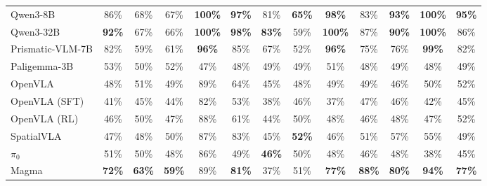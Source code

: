 \documentclass{llmxive}
\providecommand{\heatDG}[1]{\cellcolor{mydarkgreen}\textbf{#1}}
\providecommand{\heatG}[1]{\cellcolor{mygreen}#1}
\providecommand{\heatLG}[1]{\cellcolor{mylightgreen}#1}
\providecommand{\heatO}[1]{\cellcolor{myorange}#1}
\providecommand{\heatR}[1]{\cellcolor{myred}#1}
\begin{document}
\begin{table}[t]
{\begin{tabular}{lcccccccccccc}
Qwen3-8B
& \heatG{86\%} & \heatG{68\%} & \heatG{67\%} & \heatDG{\textbf{100\%}} & \heatDG{97\%} & \heatG{81\%} & \heatG{\textbf{65\%}} & \heatDG{98\%} & \heatG{83\%} & \heatDG{\textbf{93\%}} & \heatDG{\textbf{100\%}} & \heatDG{95\%} \\

Qwen3-32B
& \heatDG{92\%} & \heatG{67\%} & \heatG{66\%} & \heatDG{\textbf{100\%}} & \heatDG{\textbf{98\%}} & \heatG{\textbf{83\%}} & \heatLG{59\%} & \heatDG{\textbf{100\%}} & \heatG{87\%} & \heatDG{90\%} & \heatDG{\textbf{100\%}} & \heatG{86\%} \\

Prismatic-VLM-7B
& \heatG{82\%} & \heatLG{59\%} & \heatG{61\%} & \heatDG{96\%} & \heatG{85\%} & \heatG{67\%} & \heatO{52\%} & \heatDG{96\%} & \heatG{75\%} & \heatG{76\%} & \heatDG{99\%} & \heatG{82\%} \\

Paligemma-3B
& \heatO{53\%} & \heatO{50\%} & \heatO{52\%} & \heatO{47\%} & \heatO{48\%} & \heatO{49\%} & \heatO{49\%} & \heatO{51\%} & \heatO{48\%} & \heatO{49\%} & \heatO{48\%} & \heatO{49\%} \\
\midrule
OpenVLA
& \heatO{48\%} & \heatO{51\%} & \heatO{49\%} & \heatG{89\%} & \heatG{64\%} & \heatR{45\%} & \heatO{48\%} & \heatO{49\%} & \heatO{49\%} & \heatO{46\%} & \heatO{50\%} & \heatO{52\%} \\

OpenVLA (SFT)
& \heatR{41\%} & \heatR{45\%} & \heatR{44\%} & \heatG{82\%} & \heatO{53\%} & \heatR{38\%} & \heatO{46\%} & \heatR{37\%} & \heatO{47\%} & \heatO{46\%} & \heatR{42\%} & \heatR{45\%} \\

OpenVLA (RL)
& \heatO{46\%} & \heatO{50\%} & \heatO{47\%} & \heatG{88\%} & \heatG{61\%} & \heatR{44\%} & \heatO{50\%} & \heatO{48\%} & \heatO{46\%} & \heatO{48\%} & \heatO{47\%} & \heatO{52\%} \\

SpatialVLA
& \heatO{47\%} & \heatO{48\%} & \heatO{50\%} & \heatG{87\%} & \heatG{83\%} & \heatR{45\%} & \heatO{\textbf{52\%}} & \heatO{46\%} & \heatO{51\%} & \heatLG{57\%} & \heatLG{55\%} & \heatO{49\%} \\

$\pi_0$
& \heatO{51\%} & \heatO{50\%} & \heatO{48\%} & \heatG{86\%} & \heatO{49\%} & \heatO{\textbf{46\%}} & \heatO{50\%} & \heatO{48\%} & \heatO{46\%} & \heatO{48\%} & \heatR{38\%} & \heatR{45\%} \\

Magma
& \heatG{\textbf{72\%}} & \heatG{\textbf{63\%}} & \heatLG{\textbf{59\%}} & \heatG{89\%} & \heatG{\textbf{81\%}} & \heatR{37\%} & \heatO{51\%} & \heatG{\textbf{77\%}} & \heatG{\textbf{88\%}} & \heatG{\textbf{80\%}} & \heatDG{\textbf{94\%}} & \heatG{\textbf{77\%}} \\


\end{tabular}}
\end{table}
\end{document}
